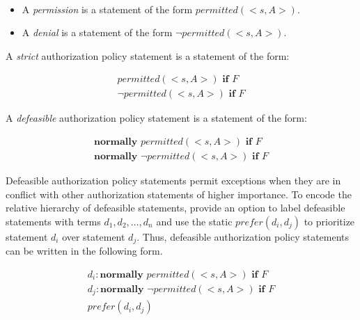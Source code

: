 \begin{definition}
    ~

    \begin{itemize}
        \item A \textit{permission} is a statement of the form $permitted(<s,A>)$.
        \item A \textit{denial} is a statement of the form $\neg permitted(<s,A>)$.
    \end{itemize}
\end{definition}

\begin{definition}
    A \textit{strict} authorization policy statement is a statement of the form:

    \begin{gather*}
        permitted\left(<s,A>\right) \textbf{ if } F \\
        \neg permitted\left(<s,A>\right) \textbf{ if } F
    \end{gather*}
\end{definition}

\begin{definition}
    A \textit{defeasible} authorization policy statement is a statement of the form:

    \begin{gather*}
        \textbf{normally } permitted(<s,A>) \textbf{ if } F \\
        \textbf{normally } \neg permitted(<s,A>) \textbf{ if } F
    \end{gather*}
\end{definition}

Defeasible authorization policy statements permit exceptions when they are in conflict with other authorization statements of higher importance.
To encode the relative hierarchy of defeasible statements, \citet{gelfond_authorization_2008} provide an option to label defeasible statements with terms $d_1,d_2,\ldots,d_n$ and use the static $prefer\left(d_i,d_j\right)$ to prioritize statement $d_i$ over statement $d_j$.
Thus, defeasible authorization policy statements can be written in the following form.

\begin{gather*}
    d_i: \textbf{normally } permitted(<s,A>) \textbf{ if } F \\
    d_j: \textbf{normally } \neg permitted(<s,A>) \textbf{ if } F \\
    prefer(d_i, d_j)
\end{gather*}

